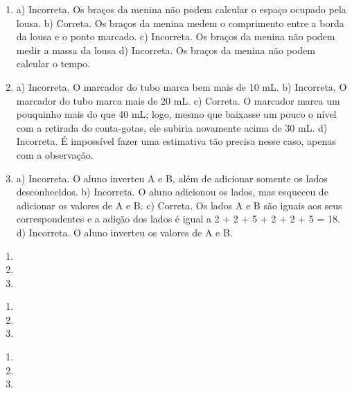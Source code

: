 
\begin{enumerate}
\item
a) Incorreta. Os braços da menina não podem calcular o espaço ocupado pela lousa.
b) Correta. Os braços da menina medem o comprimento entre a borda da lousa e o ponto marcado.
c) Incorreta. Os braços da menina não podem medir a massa da lousa
d) Incorreta. Os braços da menina não podem calcular o tempo.

\item
a) Incorreta. O marcador do tubo marca bem mais de 10 mL.
b) Incorreta. O marcador do tubo marca mais de 20 mL.
c) Correta. O marcador marca um pouquinho mais do que 40 mL; logo, mesmo que baixasse um pouco o nível com a retirada do conta-gotas, ele subiria novamente acima de 30 mL.
d) Incorreta. É impossível fazer uma estimativa tão precisa nesse caso, apenas com a observação.

\item
a) Incorreta. O aluno inverteu A e B, além de adicionar somente os lados desconhecidos.
b) Incorreta. O aluno adicionou os lados, mas esqueceu de adicionar os valores de A e B.
c) Correta. Os lados A e B são iguais aos seus correspondentes e a adição dos lados é igual a 2 + 2 + 5 + 2 + 2 + 5 = 18.
d) Incorreta. O aluno inverteu os valores de A e B.
\end{enumerate}


\begin{enumerate}
\item

\item

\item
\end{enumerate}


\begin{enumerate}
\item

\item

\item
\end{enumerate}


\begin{enumerate}
\item

\item

\item
\end{enumerate}

